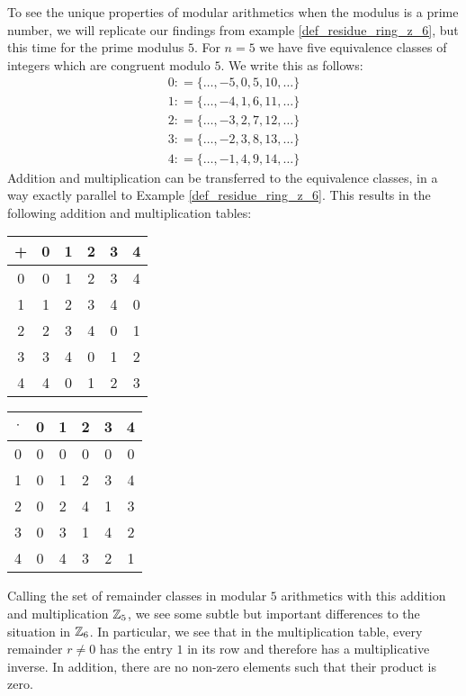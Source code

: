 \begin{example}  
\label{primfield_z_5}
To see the unique properties of modular arithmetics when the modulus is a prime number, we will replicate our findings from example \ref{def_residue_ring_z_6}, but this time for the prime modulus $5$.
For $ n = 5 $ we have five equivalence classes of integers which are congruent modulo $ 5 $. We write this as follows:
$$
\begin{array}{ccc}
0: = \{\ldots, -5,0,5,10, \ldots \}\\
1: = \{\ldots, -4,1,6,11, \ldots \}\\
2: = \{\ldots, -3,2,7,12, \ldots \} \\
3: = \{\ldots, -2,3,8,13, \ldots \}\\
4: = \{\ldots, -1,4,9,14, \ldots \}
\end{array}
$$
Addition and multiplication can be transferred to the equivalence classes, in a way exactly parallel to Example \ref{def_residue_ring_z_6}. This results in the following addition and multiplication tables:
\begin{center}
  \begin{tabular}{c | c c c c c}
    + & 0 & 1 & 2 & 3 & 4 \\\hline
    0 & 0 & 1 & 2 & 3 & 4 \\
    1 & 1 & 2 & 3 & 4 & 0 \\
    2 & 2 & 3 & 4 & 0 & 1 \\
    3 & 3 & 4 & 0 & 1 & 2 \\
    4 & 4 & 0 & 1 & 2 & 3 \\
  \end{tabular} \quad \quad \quad \quad
  \begin{tabular}{c | c c c c c}
$ \cdot $ & 0 & 1 & 2 & 3 & 4 \\\hline
      0 & 0 & 0 & 0 & 0 & 0 \\
      1 & 0 & 1 & 2 & 3 & 4 \\
      2 & 0 & 2 & 4 & 1 & 3 \\
      3 & 0 & 3 & 1 & 4 & 2 \\
      4 & 0 & 4 & 3 & 2 & 1 \\
  \end{tabular}
\end{center}
Calling the set of remainder classes in modular $5$ arithmetics with this addition and multiplication $\mathbb{Z}_5$, we see some subtle but important differences to the situation in $\mathbb{Z}_6$. In particular, we see that in the multiplication table, every remainder $r\neq 0$ has the entry $1$ in its row and therefore has a multiplicative inverse. In addition, there are no non-zero elements such that their product is zero.


\end{example}
